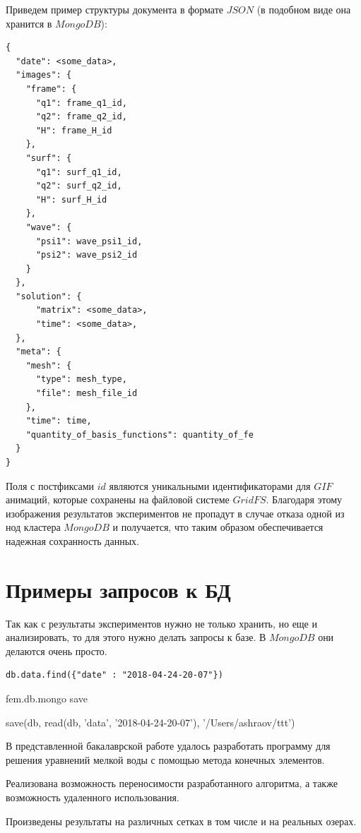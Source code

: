 \documentclass[14pt]{extreport}
\begin{document}
Приведем пример структуры документа в формате $JSON$ (в подобном виде она хранится в $MongoDB$):

\begin{lstlisting}
{
  "date": <some_data>,
  "images": {
    "frame": {
      "q1": frame_q1_id,
      "q2": frame_q2_id,
      "H": frame_H_id
    },
    "surf": {
      "q1": surf_q1_id,
      "q2": surf_q2_id,
      "H": surf_H_id
    },
    "wave": {
      "psi1": wave_psi1_id,
      "psi2": wave_psi2_id
    }
  },
  "solution": {
      "matrix": <some_data>,
      "time": <some_data>,
  },
  "meta": {
    "mesh": {
      "type": mesh_type,
      "file": mesh_file_id
    },
    "time": time,
    "quantity_of_basis_functions": quantity_of_fe
  }
}
\end{lstlisting}

Поля с постфиксами $id$ являются уникальными идентификаторами для $GIF$ анимаций, которые сохранены на файловой системе $GridFS$. Благодаря этому изображения  результатов экспериментов не пропадут в случае отказа одной из нод кластера $MongoDB$ и получается, что таким образом обеспечивается надежная сохранность данных.

\section{Примеры запросов к БД}
Так как с результаты экспериментов нужно не только хранить, но еще и анализировать, то для этого нужно делать запросы к базе. В $MongoDB$ они делаются очень просто.

\begin{lstlisting}
db.data.find({"date" : "2018-04-24-20-07"})
\end{lstlisting}


fem.db.mongo
save

save(db, read(db, 'data', '2018-04-24-20-07'), '/Users/ashraov/ttt')



\conclusions

В представленной бакалаврской работе удалось разработать программу для решения уравнений мелкой воды с помощью метода конечных элементов.

Реализована возможность переносимости разработанного алгоритма, а также возможность удаленного использования.

Произведены результаты на различных сетках в том числе и на реальных озерах.





\end{document}
